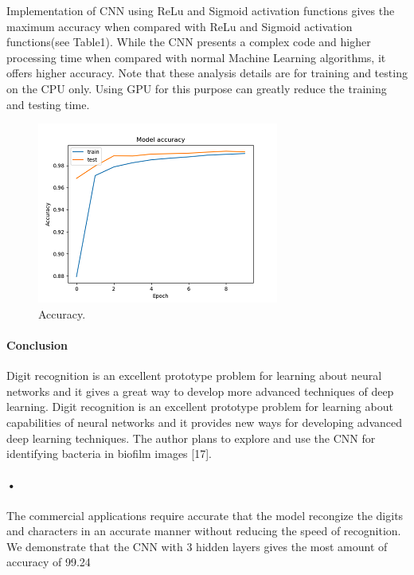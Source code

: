 \documentclass{article}
\begin{document}
Implementation of CNN using ReLu and Sigmoid activation functions gives the maximum accuracy when compared with ReLu and Sigmoid activation functions(see Table1). While the CNN presents a complex code and higher  processing time when compared with normal Machine Learning algorithms, it offers higher accuracy. Note that these analysis details are for training and testing on the CPU only. Using GPU for this purpose can greatly reduce the training and testing time.
\begin{figure}
  \includegraphics[width=\linewidth]{CNNAccuracy.png}  
  \caption{Accuracy.}
 \end{figure}

\paragraph{Conclusion}
Digit recognition is an excellent prototype problem for learning about neural networks and it gives a great way to develop more advanced techniques of deep learning. 
Digit recognition is an excellent prototype problem for learning about capabilities of neural networks and it provides new ways for developing advanced deep learning techniques. The author plans to explore and use the CNN for identifying bacteria in biofilm images [17].

\paragraph{•}
The commercial applications require accurate that the model recongize the digits and characters in an accurate manner without reducing the speed of recognition. We demonstrate that the CNN with 3 hidden layers gives the most amount of accuracy of 99.24%
\end{document}
